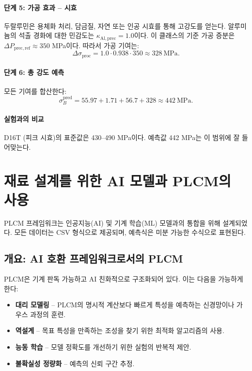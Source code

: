 \documentclass[12pt,a4paper]{article}
\begin{document}
	\paragraph{단계 5: 가공 효과 – 시효}
	두랄루민은 용체화 처리, 담금질, 자연 또는 인공 시효를 통해 고강도를 얻는다. 알루미늄의 석출 경화에 대한 민감도는 \(\kappa_{\mathrm{Al,prec}}=1.0\)이다. 이 클래스의 기준 가공 증분은 \(\Delta P_{\mathrm{prec,ref}}\approx 350\) MPa이다. 따라서 가공 기여는:
	\[
	\Delta\sigma_{\mathrm{proc}} = 1.0\cdot0.938\cdot350 \approx 328\ \text{MPa}.
	\]
	
	\paragraph{단계 6: 총 강도 예측}
	모든 기여를 합산한다:
	\[
	\sigma_B^{\mathrm{pred}} = 55.97 + 1.71 + 56.7 + 328 \approx 442\ \text{MPa}.
	\]
	
	\paragraph{실험과의 비교}
	D16T (피크 시효)의 표준값은 430–490 MPa이다. 예측값 442 MPa는 이 범위에 잘 들어맞는다.
	
	\section{재료 설계를 위한 AI 모델과 PLCM의 사용}
	\label{sec:ai-integration}
	
	PLCM 프레임워크는 인공지능(AI) 및 기계 학습(ML) 모델과의 통합을 위해 설계되었다. 모든 데이터는 CSV 형식으로 제공되며, 예측식은 미분 가능한 수식으로 표현된다.
	
	\subsection{개요: AI 호환 프레임워크로서의 PLCM}
	
	PLCM은 기계 판독 가능하고 AI 친화적으로 구조화되어 있다. 이는 다음을 가능하게 한다:
	\begin{itemize}
		\item \textbf{대리 모델링} – PLCM의 명시적 계산보다 빠르게 특성을 예측하는 신경망이나 가우스 과정의 훈련.
		\item \textbf{역설계} – 목표 특성을 만족하는 조성을 찾기 위한 최적화 알고리즘의 사용.
		\item \textbf{능동 학습} – 모델 정확도를 개선하기 위한 실험의 반복적 제안.
		\item \textbf{불확실성 정량화} – 예측의 신뢰 구간 추정.
	\end{itemize}
	
\end{document}
